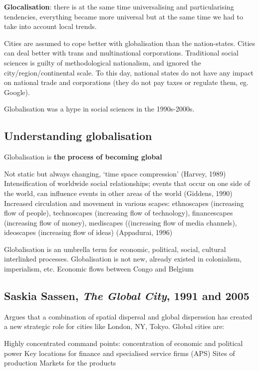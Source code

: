 \documentclass{article}
\begin{document}
\textbf{Glocalisation}: there is at the same time universalising and particularising tendencies, everything became more universal but at the same time we had to take into account local trends. 

Cities are assumed to cope better with globalisation than the nation-states. Cities can deal better with trans and multinational corporations.
Traditional social sciences is guilty of methodological nationalism, and ignored the city/region/continental scale. To this day, national states do not have any impact on national trade and corporations (they do not pay taxes or regulate them, eg. Google).

Globalisation was a hype in social sciences in the 1990s-2000s.

\subsection{Understanding globalisation}

Globalisation is \textbf{the process of becoming global}
\begin{outline}
	\1 Not static but always changing, `time space compression' (Harvey, 1989)
	\1 Intensification of worldwide social relationships; events that occur on one side of the world, can influence events in other areas of the world (Giddens, 1990)
	\1 Increased circulation and movement in various scapes: ethnoscapes (increasing flow of people), technoscapes (increasing flow of technology), financescapes (increasing flow of money), mediscapes ((increasing flow of media channels), ideoscapes (increasing flow of ideas) (Appadurai, 1996)
\end{outline}

Globalisation is an umbrella term for economic, political, social, cultural interlinked processes.
Globalisation is not new, already existed in colonialism, imperialism, etc. Economic flows between Congo and Belgium 

\subsection{Saskia Sassen, \textit{The Global City}, 1991 and 2005}

Argues that a combination of spatial dispersal and global disperssion has created a new strategic role for cities like London, NY, Tokyo. Global cities are:

\begin{outline}
	\1 Highly concentrated command points: concentration of economic and political power
	\1 Key locations for finance and specialised service firms (APS)
	\1 Sites of production
	\1 Markets for the products
\end{outline}
\end{document}
